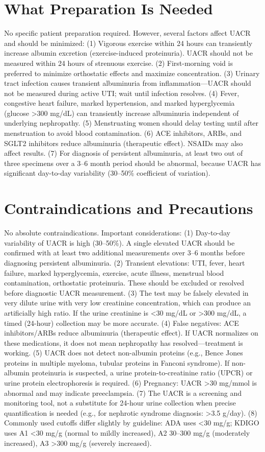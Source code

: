 \section*{What Preparation Is Needed}
No specific patient preparation required. However, several factors affect UACR and should be minimized: (1) Vigorous exercise within 24 hours can transiently increase albumin excretion (exercise-induced proteinuria). UACR should not be measured within 24 hours of strenuous exercise. (2) First-morning void is preferred to minimize orthostatic effects and maximize concentration. (3) Urinary tract infection causes transient albuminuria from inflammation---UACR should not be measured during active UTI; wait until infection resolves. (4) Fever, congestive heart failure, marked hypertension, and marked hyperglycemia (glucose >300 mg/dL) can transiently increase albuminuria independent of underlying nephropathy. (5) Menstruating women should delay testing until after menstruation to avoid blood contamination. (6) ACE inhibitors, ARBs, and SGLT2 inhibitors reduce albuminuria (therapeutic effect). NSAIDs may also affect results. (7) For diagnosis of persistent albuminuria, at least two out of three specimens over a 3--6 month period should be abnormal, because UACR has significant day-to-day variability (30--50\% coefficient of variation).

\section*{Contraindications and Precautions}
No absolute contraindications. Important considerations: (1) Day-to-day variability of UACR is high (30--50\%). A single elevated UACR should be confirmed with at least two additional measurements over 3--6 months before diagnosing persistent albuminuria. (2) Transient elevations: UTI, fever, heart failure, marked hyperglycemia, exercise, acute illness, menstrual blood contamination, orthostatic proteinuria. These should be excluded or resolved before diagnostic UACR measurement. (3) The test may be falsely elevated in very dilute urine with very low creatinine concentration, which can produce an artificially high ratio. If the urine creatinine is <30 mg/dL or >300 mg/dL, a timed (24-hour) collection may be more accurate. (4) False negatives: ACE inhibitors/ARBs reduce albuminuria (therapeutic effect). If UACR normalizes on these medications, it does not mean nephropathy has resolved---treatment is working. (5) UACR does not detect non-albumin proteins (e.g., Bence Jones proteins in multiple myeloma, tubular proteins in Fanconi syndrome). If non-albumin proteinuria is suspected, a urine protein-to-creatinine ratio (UPCR) or urine protein electrophoresis is required. (6) Pregnancy: UACR >30 mg/mmol is abnormal and may indicate preeclampsia. (7) The UACR is a screening and monitoring tool, not a substitute for 24-hour urine collection when precise quantification is needed (e.g., for nephrotic syndrome diagnosis: >3.5 g/day). (8) Commonly used cutoffs differ slightly by guideline: ADA uses <30 mg/g; KDIGO uses A1 <30 mg/g (normal to mildly increased), A2 30--300 mg/g (moderately increased), A3 >300 mg/g (severely increased).

